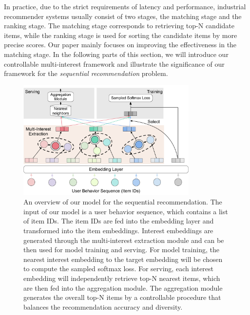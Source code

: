 In practice, due to the strict requirements of latency and performance, industrial recommender systems usually consist of two stages, the matching stage and the ranking stage. The matching stage corresponds to retrieving top-N candidate items, while the ranking stage is used for sorting the candidate items by more precise scores. Our paper mainly focuses on improving the effectiveness in the matching stage. In the following parts of this section, we will introduce our controllable multi-interest framework and illustrate the significance of our framework for the \textit{sequential recommendation} problem. %

\begin{figure}
    \centering
    \includegraphics[width=0.8\textwidth]{figures/multi-interest-framework.pdf}
    \caption{An overview of our model for the sequential recommendation. The input of our model is a user behavior sequence, which contains a list of item IDs. The item IDs are fed into the embedding layer and transformed into the item embeddings. Interest embeddings are generated through the multi-interest extraction module and can be then used for model training and serving. For model training, the nearest interest embedding to the target embedding will be chosen to compute the sampled softmax loss. For serving, each interest embedding will independently retrieve top-N nearest items, which are then fed into the aggregation module. The aggregation module generates the overall top-N items by a controllable procedure that balances the recommendation accuracy and diversity. }
    \label{fig:capsule_matching}
\end{figure}


